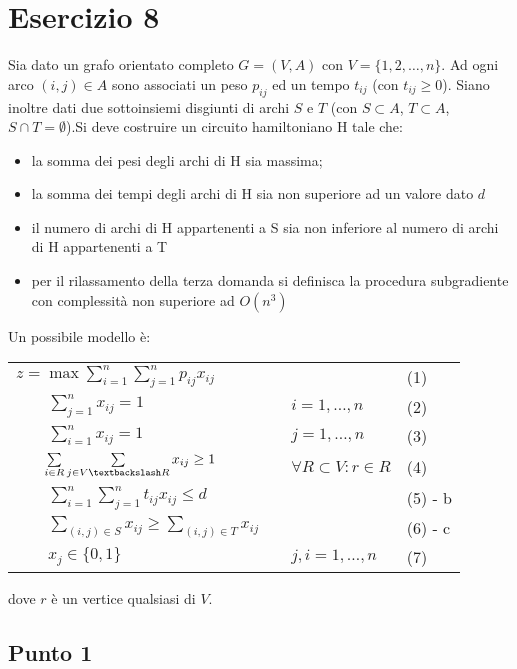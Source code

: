 \documentclass[11pt]{book}
\begin{document}
\chapter*{Esercizio 8}

Sia dato un grafo orientato completo $G=(V,A)$ con
$V=\{1,2,\dots,n\}$. Ad ogni arco $(i,j) \in A$ sono associati un peso
$p_{ij}$ ed un tempo $t_{ij}$ (con $t_{ij}\geq 0$). Siano inoltre dati
due sottoinsiemi disgiunti di archi $S$ e $T$ (con $S \subset A$,
$T\subset A$, $S\cap T = \emptyset$).Si deve costruire un circuito
hamiltoniano H tale che:

\begin{itemize}
\item la somma dei pesi degli archi di H sia massima;
\item la somma dei tempi degli archi di H sia non superiore ad un
  valore dato $d$
\item il numero di archi di H appartenenti a S sia non inferiore al
  numero di archi di H appartenenti a T
\item per il rilassamento della terza domanda si definisca la
  procedura subgradiente con complessit\`a non superiore ad $O(n^3)$
\end{itemize}

Un possibile modello \`e:

\begin{center}
\begin{tabular}{lp{2cm}ll}
  $z = \max \sum\limits_{i=1}^n\sum\limits_{j=1}^n p_{ij}x_{ij}$ & & & (1)\\
  $\qquad \sum\limits_{j=1}^n x_{ij} = 1$ & & $i=1,\dots,n$ & (2)\\
  $\qquad \sum\limits_{i=1}^n x_{ij} = 1$ & & $j=1,\dots,n$ & (3)\\
  $\qquad \sum\limits_{i \in R}\sum\limits_{j \in V \textbackslash R}
  x_{ij} \geq 1$ & & $\forall R \subset V : r \in R$ & (4) \\
  $\qquad \sum\limits_{i=1}^n\sum\limits_{j=1}^n t_{ij}x_{ij} \leq d$ &
  & & (5) - b \\
  $\qquad \sum\limits_{(i,j)\in S} x_{ij} \geq \sum\limits_{(i,j) \in
    T}x_{ij}$ &&& (6) - c \\
  $\qquad x_j \in\{0,1\}$ & & $j,i = 1,\dots,n$ & (7) \\
\end{tabular}
\end{center}

dove $r$ \`e un vertice qualsiasi di $V$.

\section*{Punto 1}
\end{document}

